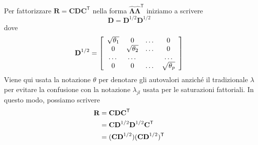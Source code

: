 Per fattorizzare $\textbf{R} = \textbf{C}\textbf{D}\textbf{C}^{\ensuremath{\mathsf{T}}}$ nella forma $\hat{\boldsymbol{\Lambda}} \hat{\boldsymbol{\Lambda}}^{\ensuremath{\mathsf{T}}}$ iniziamo a scrivere
\begin{equation}
\textbf{D}= \textbf{D}^{1/2} \textbf{D}^{1/2} 
\end{equation}
dove
\begin{equation}
\textbf{D}^{1/2} = 
\left[
  \begin{array}{ c c c c }
     \sqrt{\theta_1} & 0 & \dots & 0 \\
     0 & \sqrt{\theta_2} & \dots & 0 \\
     \dots & \dots & & \dots \\
     0 & 0 & \dots &  \sqrt{\theta_p}
  \end{array} 
\right] 
\end{equation}
Viene qui usata la notazione $\theta$ per denotare gli autovalori anziché il tradizionale $\lambda$ per evitare la confusione con la notazione $\lambda_{jl}$ usata per le saturazioni fattoriali.
In questo modo, possiamo scrivere
\begin{align}
\textbf{R} &= \textbf{C}\textbf{D}\textbf{C}^{\ensuremath{\mathsf{T}}}\notag\\
&= \textbf{C}\textbf{D}^{1/2}\textbf{D}^{1/2}\textbf{C}^{\ensuremath{\mathsf{T}}}\notag\\
&= (\textbf{C}\textbf{D}^{1/2}) (\textbf{C}\textbf{D}^{1/2})^{\ensuremath{\mathsf{T}}}
\end{align}

